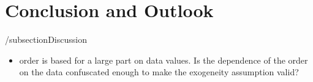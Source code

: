 \newpage
\section{Conclusion and Outlook}



/subsection{Discussion}
\begin{itemize}
    \item order is based for a large part on data values. Is the dependence of the order on the data confuscated enough to make the exogeneity assumption valid?
\end{itemize}

